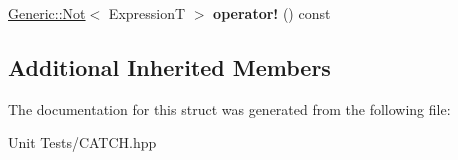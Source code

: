 \begin{DoxyCompactItemize}
\item 
\hyperlink{classCatch_1_1Matchers_1_1Impl_1_1Generic_1_1Not}{Generic\+::\+Not}$<$ ExpressionT $>$ {\bfseries operator!} () const \hypertarget{structCatch_1_1Matchers_1_1Impl_1_1Matcher_a534857633dde84924993b674cb248c8f}{}\label{structCatch_1_1Matchers_1_1Impl_1_1Matcher_a534857633dde84924993b674cb248c8f}

\end{DoxyCompactItemize}
\subsection*{Additional Inherited Members}


The documentation for this struct was generated from the following file\+:\begin{DoxyCompactItemize}
\item 
Unit Tests/C\+A\+T\+C\+H.\+hpp\end{DoxyCompactItemize}
